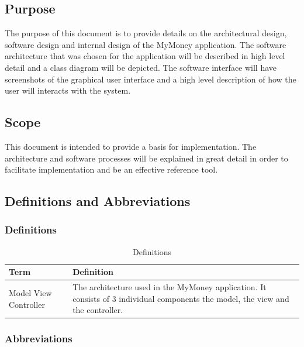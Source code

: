 \documentclass[12pt]{article}
\begin{document}
\subsection{Purpose}
The purpose of this document is to provide details on the architectural design, software design and internal design of the MyMoney application. The software architecture that was chosen for the application will be described in high level detail and a class diagram will be depicted. The software interface will have screenshots of the graphical user interface and a high level description of how the user will interacts with the system.


\subsection{Scope}
This document is intended to provide a basis for implementation. The architecture and software processes will be explained in great detail in order to facilitate implementation and be an effective reference tool. 


\subsection{Definitions and Abbreviations}

\subsubsection{Definitions}
\begin{table}[H]
\caption{Definitions}
\begin{center}
\begin{tabular}{|p{3cm}|p{12cm}|}
\hline
Term & Definition \\
\hline\hline Model View Controller & The architecture used in the MyMoney application. It consists of 3 individual components the model, the view and the controller.  \\
\hline

\end{tabular}
\end{center}
\end{table}

\subsubsection{Abbreviations}
\end{document}
